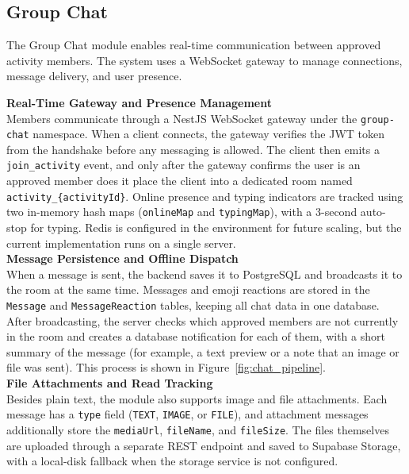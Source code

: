 \documentclass[a4paper,12pt]{report}
\begin{document}
\subsection{Group Chat}

The Group Chat module enables real-time communication between approved activity members. The system uses a WebSocket gateway to manage connections, message delivery, and user presence.

\textbf{Real-Time Gateway and Presence Management}
\\ Members communicate through a NestJS WebSocket gateway under the \texttt{group-chat} namespace. When a client connects, the gateway verifies the JWT token from the handshake before any messaging is allowed. The client then emits a \texttt{join\_activity} event, and only after the gateway confirms the user is an approved member does it place the client into a dedicated room named \texttt{activity\_\{activityId\}}. Online presence and typing indicators are tracked using two in-memory hash maps (\texttt{onlineMap} and \texttt{typingMap}), with a 3-second auto-stop for typing. Redis is configured in the environment for future scaling, but the current implementation runs on a single server. \\

\textbf{Message Persistence and Offline Dispatch}
\\ When a message is sent, the backend saves it to PostgreSQL and broadcasts it to the room at the same time. Messages and emoji reactions are stored in the \texttt{Message} and \texttt{MessageReaction} tables, keeping all chat data in one database. After broadcasting, the server checks which approved members are not currently in the room and creates a database notification for each of them, with a short summary of the message (for example, a text preview or a note that an image or file was sent). This process is shown in Figure~\ref{fig:chat_pipeline}. \\

\textbf{File Attachments and Read Tracking}
\\ Besides plain text, the module also supports image and file attachments. Each message has a \texttt{type} field (\texttt{TEXT}, \texttt{IMAGE}, or \texttt{FILE}), and attachment messages additionally store the \texttt{mediaUrl}, \texttt{fileName}, and \texttt{fileSize}. The files themselves are uploaded through a separate REST endpoint and saved to Supabase Storage, with a local-disk fallback when the storage service is not configured.
\end{document}
